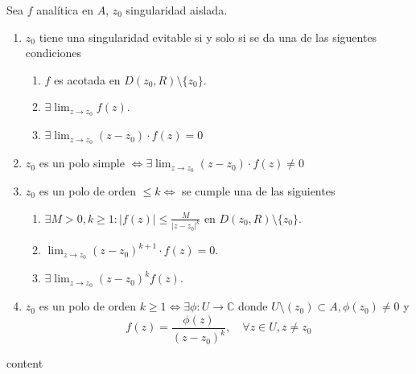 \begin{prop}
  Sea $f$ analítica en $A$, $z_{0}$ singularidad aislada.
  \begin{enumerate}[label=(\roman*)]
    \item $z_{0}$ tiene una singularidad evitable si y solo si se da una de las siguentes condiciones
      \begin{enumerate}
        \item $f$ es acotada en $D(z_{0}, R) \setminus \{ z_{0} \}$.
        \item $\exists \lim_{z \to z_{0}} f(z)$.
        \item $\exists \lim_{z \to z_{0}} (z - z_{0}) \cdot f(z) = 0$
      \end{enumerate}
    \item $z_{0}$ es un polo simple $\Leftrightarrow \exists \lim_{z \to z_{0}} (z - z_{0}) \cdot f(z) \neq 0$
    \item $z_{0}$ es un polo de orden $\leq k \Leftrightarrow$ se cumple una de las siguientes
      \begin{enumerate}
        \item $\exists M > 0, k \geq 1 : | f(z) | \leq \frac{M}{| z -z_{0} |^{k}}$ en $D(z_{0}, R) \setminus \{ z_{0} \}$.
        \item $\lim_{z \to z_{0}} (z - z_{0})^{k+1} \cdot f(z) = 0$.
        \item $\exists \lim_{z \to z_{0}} (z -z_{0})^{k} f(z)$.
      \end{enumerate}
    \item $z_{0}$ es un polo de orden $k \geq 1 \Leftrightarrow \exists \phi : U \to \mathbb{C}$ donde $U \setminus (z_{0}) \subset A, \phi(z_{0}) \neq 0$ y
      \[ 
        f(z) = \frac{\phi(z)}{(z -z_{0})^{k}}, \quad \forall z \in U, z \neq z_{0}
      \] 
  \end{enumerate}
\end{prop}

\begin{dem}
  content
\end{dem}
